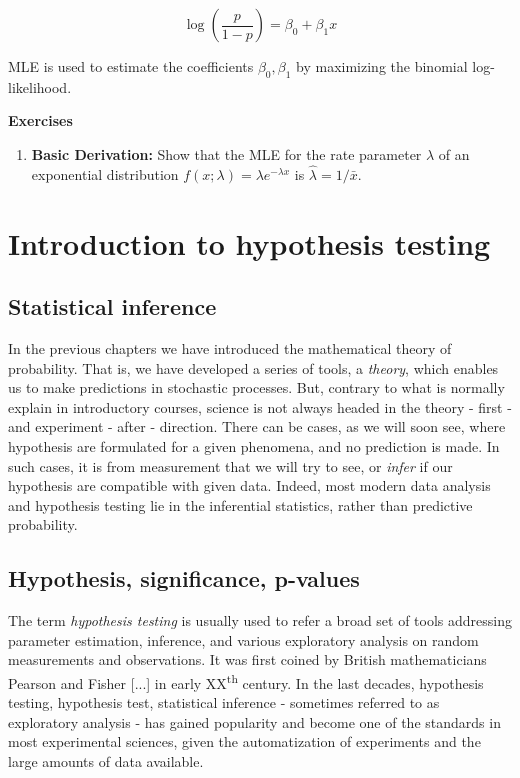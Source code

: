 \documentclass{book}
\begin{document}
\[
\log\left( \frac{p}{1 - p} \right) = \beta_0 + \beta_1 x
\]

MLE is used to estimate the coefficients $\beta_0, \beta_1$ by maximizing the binomial log-likelihood.

\textbf{Exercises}
\begin{enumerate}
\item \textbf{Basic Derivation:} Show that the MLE for the rate parameter $\lambda$ of an exponential distribution $f(x; \lambda) = \lambda e^{-\lambda x}$ is $\hat{\lambda} = 1 / \bar{x}$.
\end{enumerate}



\chapter{Introduction to hypothesis testing}

\section{Statistical inference}
In the previous chapters we have introduced the mathematical theory of probability. That is, we have developed a series of tools, a \textit{theory}, which enables us to make predictions in stochastic processes. But, contrary to what is normally explain in introductory courses, science is not always headed in the theory - first - and experiment - after - direction. There can be cases, as we will soon see, where hypothesis are formulated for a given phenomena, and no prediction is made. In such cases, it is from measurement that we will try to see, or \textit{infer} if our hypothesis are compatible with given data. Indeed, most modern data analysis and hypothesis testing lie in the inferential statistics, rather than predictive probability.

\section{Hypothesis, significance, p-values}
The term \textit{hypothesis testing} is usually used to refer a broad set of tools addressing parameter estimation, inference, and various exploratory analysis on random measurements and observations. It was first coined by British mathematicians Pearson and Fisher [...] in early XX\textsuperscript{th} century. In the last decades, hypothesis testing, hypothesis test, statistical inference - sometimes referred to as  exploratory analysis - has gained popularity and become one of the standards in most experimental sciences, given the automatization of experiments and the large amounts of data available.\\
\end{document}
